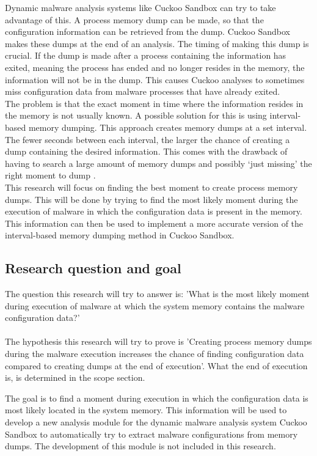 \documentclass[conference]{IEEEtran}
\begin{document}
Dynamic malware analysis systems like Cuckoo Sandbox \cite{cuckoo} can try to take advantage of this. A process memory dump can be made, so that the configuration information can be retrieved from the dump. Cuckoo Sandbox makes these dumps at the end of an analysis. The timing of making this dump is crucial. If the dump is made after a process containing the information has exited, meaning the process has ended and no longer resides in the memory, the information will not be in the dump. This causes Cuckoo analyses to sometimes miss \Gls{configuration data} from malware processes that have already exited.\\

The problem is that the exact moment in time where the information resides in the memory is not usually known. A possible solution for this is using interval-based memory dumping. This approach creates memory dumps at a set interval. The fewer seconds between each interval, the larger the chance of creating a dump containing the desired information. This comes with the drawback of having to search a large amount of memory dumps and possibly ‘just missing’ the right moment to dump \cite{teller-memory}.\\

This research will focus on finding the best moment to create process memory dumps. This will be done by trying to find the most likely moment during the execution of malware in which the \Gls{configuration data} is present in the memory. This information can then be used to implement a more accurate version of the interval-based memory dumping method in Cuckoo Sandbox.\\


\subsection{Research question and goal}
The question this research will try to answer is: 'What is the most likely moment during execution of malware at which the system memory contains the malware \Gls{configuration data}?'\\
\\The hypothesis this research will try to prove is 'Creating process memory dumps during the malware execution increases the chance of finding \Gls{configuration data} compared to creating dumps at the end of execution'. What the end of execution is, is determined in the scope section.

The goal is to find a moment during execution in which the \Gls{configuration data} is most likely located in the system memory. This information will be used to develop a new analysis module for the dynamic malware analysis system Cuckoo Sandbox to automatically try to extract malware configurations from memory dumps. The development of this module is not included in this research.
\end{document}
